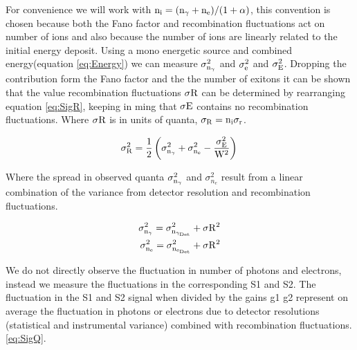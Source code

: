 For convenience we will work with $\rm n_i = (\rm n_\gamma + n_e)/(1+\alpha)$, this convention is chosen because both the Fano factor and recombination fluctuations act on number of ions and also because the number of ions are linearly related to the initial energy deposit. Using a mono energetic source and combined energy(equation \ref{eq:Energy}) we can measure $\rm \sigma_{n_\gamma}^2$ and $\rm \sigma_{e}^2$ and $\rm \sigma_{E}^2$. Dropping the contribution form the Fano factor and the the number of exitons it can be shown that the value recombination fluctuations $\rm \sigma R$ can be determined by rearranging equation \ref{eq:SigR}, keeping in ming that $\rm \sigma E$ contains no recombination fluctuations. Where $\rm \sigma R$ is in units of quanta, $\rm \sigma_R = n_i\sigma_r$.

\begin{equation}
\rm \sigma_{R}^2  = \frac{1}{2}\left(\sigma_{n_\gamma}^2 + \sigma_{n_e}^2 - \frac{\sigma_E^2}{W^2}\right)\\
\label{eq:Dahl}
\end{equation}

Where the spread in observed quanta $\rm \sigma_{n_\gamma}^2$ and $\sigma_{n_e}^2$ result from a linear combination of the variance from detector resolution and recombination fluctuations.

\begin{equation}
\begin{split}
\rm  \sigma_{n_{\gamma}}^2 = \sigma_{n_{\gamma_{Det}}}^2 + \sigma{R^2}\\
\rm \sigma_{n_{e}}^2 = \sigma_{n_{e_{Det}}}^2 + \sigma{R^2}
\label{eq:SigQ}
\end{split}
\end{equation}

We do not directly observe the fluctuation in number of photons and electrons, instead we measure the fluctuations in the corresponding S1 and S2. The fluctuation in the S1 and S2 signal when divided by the gains g1 g2 represent on average the fluctuation in photons or electrons due to detector resolutions (statistical and instrumental variance) combined with recombination fluctuations. \ref{eq:SigQ}.


